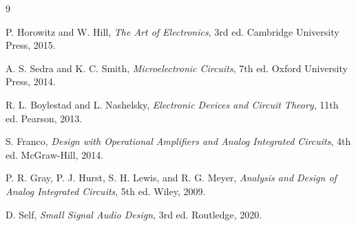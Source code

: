 \documentclass[12pt,a4paper]{report}
\begin{document}


\clearpage

\clearpage


\clearpage

\clearpage

\clearpage

\tableofcontents
\clearpage
\listoffigures
\listoftables
\clearpage















\appendix
\renewcommand{\chaptername}{Appendix}





\begin{thebibliography}{9}

P. Horowitz and W. Hill, \textit{The Art of Electronics}, 3rd ed. Cambridge University Press, 2015.

A. S. Sedra and K. C. Smith, \textit{Microelectronic Circuits}, 7th ed. Oxford University Press, 2014.

R. L. Boylestad and L. Nashelsky, \textit{Electronic Devices and Circuit Theory}, 11th ed. Pearson, 2013.

S. Franco, \textit{Design with Operational Amplifiers and Analog Integrated Circuits}, 4th ed. McGraw-Hill, 2014.

P. R. Gray, P. J. Hurst, S. H. Lewis, and R. G. Meyer, \textit{Analysis and Design of Analog Integrated Circuits}, 5th ed. Wiley, 2009.

D. Self, \textit{Small Signal Audio Design}, 3rd ed. Routledge, 2020.

\end{thebibliography}
\end{document}
